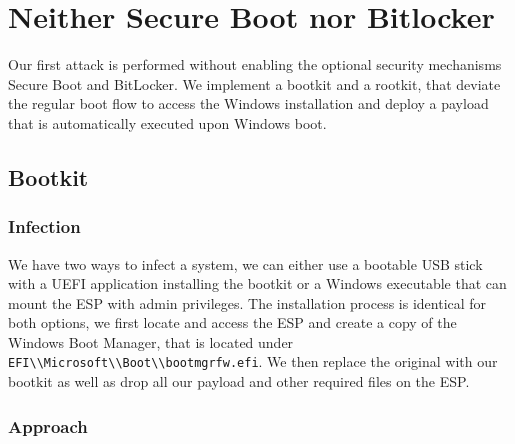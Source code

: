 
\section{Neither Secure Boot nor Bitlocker}

Our first attack is performed without enabling the optional security mechanisms Secure Boot and BitLocker.
We implement a bootkit and a rootkit, that deviate the regular boot flow to access the Windows installation and deploy a payload that is automatically executed upon Windows boot.

\subsection{Bootkit}

\subsubsection{Infection}

We have two ways to infect a system, we can either use a bootable USB stick with a UEFI application installing the bootkit or a Windows executable that can mount the \ac{ESP} with admin privileges.
The installation process is identical for both options, we first locate and access the \ac{ESP} and create a copy of the Windows Boot Manager, that is located under \lstinline{EFI\\Microsoft\\Boot\\bootmgrfw.efi}. We then replace the original with our bootkit as well as drop all our payload and other required files on the \ac{ESP}.

\subsubsection{Approach}


